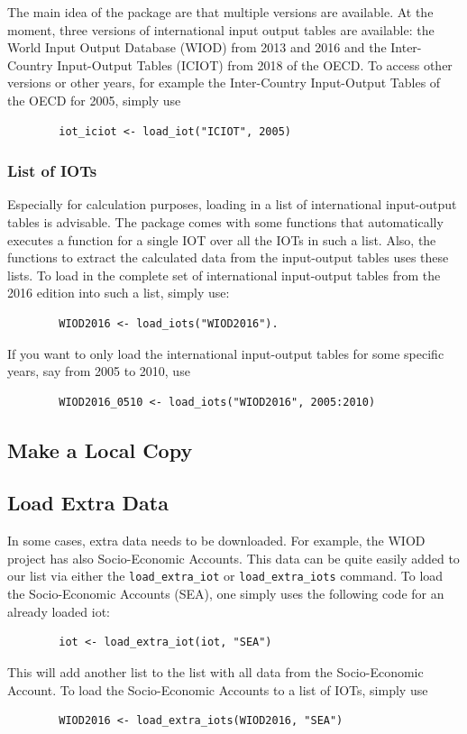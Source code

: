 \documentclass[10pt,a4paper]{paper}
\begin{document}
	The main idea of the package are that multiple versions are available. At the moment, three versions of international input output tables are available: the World Input Output Database (WIOD) from 2013 and 2016 and the Inter-Country Input-Output Tables (ICIOT) from 2018 of the OECD. To access other versions or other years, for example the Inter-Country Input-Output Tables of the OECD for 2005, simply use	
	\begin{verbatim}
		iot_iciot <- load_iot("ICIOT", 2005)
	\end{verbatim}
	
	\subsubsection{List of IOTs}
	Especially for calculation purposes, loading in a list of international input-output tables is advisable. The package comes with some functions that automatically executes a function for a single IOT over all the IOTs in such a list. Also, the functions to extract the calculated data from the input-output tables uses these lists. To load in the complete set of international input-output tables from the 2016 edition into such a list, simply use:
	\begin{verbatim}
		WIOD2016 <- load_iots("WIOD2016").
	\end{verbatim}
	If you want to only load the international input-output tables for some specific years, say from 2005 to 2010, use
	\begin{verbatim}
		WIOD2016_0510 <- load_iots("WIOD2016", 2005:2010)
	\end{verbatim}
	
	\subsection{Make a Local Copy}
	
	\subsection{Load Extra Data}
	In some cases, extra data needs to be downloaded. For example, the WIOD project has also Socio-Economic Accounts. This data can be quite easily added to our list via either the \texttt{load\_extra\_iot} or \texttt{load\_extra\_iots} command. To load the Socio-Economic Accounts (SEA), one simply uses the following code for an already loaded iot:
	\begin{verbatim}
		iot <- load_extra_iot(iot, "SEA")
	\end{verbatim}
	This will add another list to the list with all data from the Socio-Economic Account. 
	To load the Socio-Economic Accounts to a list of IOTs, simply use
	\begin{verbatim}
		WIOD2016 <- load_extra_iots(WIOD2016, "SEA")
	\end{verbatim}
	
\end{document}
